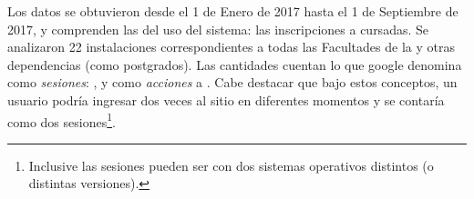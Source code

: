 Los datos se obtuvieron desde el 1 de Enero de 2017 hasta el 1 de Septiembre de 2017, y comprenden las  del uso del sistema: las inscripciones a cursadas. Se analizaron 22 instalaciones correspondientes a todas las Facultades de la \unlp{} y otras dependencias (como postgrados).
Las cantidades cuentan lo que google denomina como \textit{sesiones}: , y como \textit{acciones} a \cite{google2017analyticsSesion}.
Cabe destacar que bajo estos conceptos, un usuario podría ingresar dos veces al sitio en diferentes momentos y se contaría como dos sesiones\footnote{Inclusive las sesiones pueden ser con dos sistemas operativos distintos (o distintas versiones).}.

